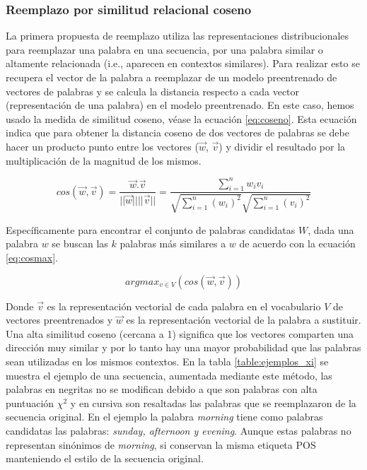 

\subsubsection{Reemplazo por similitud relacional coseno}

La primera propuesta de reemplazo utiliza las representaciones distribucionales para reemplazar una palabra en una secuencia, por una palabra similar o altamente relacionada (i.e., aparecen en contextos similares). Para realizar esto se recupera el vector de la palabra a reemplazar de un modelo preentrenado de vectores de palabras y se calcula la distancia respecto a cada vector (representación de una palabra) en el modelo preentrenado. En este caso, hemos usado la medida de similitud coseno, véase la ecuación \ref{eq:coseno}. Esta ecuación indica que para obtener la distancia coseno de dos vectores de palabras se debe hacer un producto punto entre los vectores ($\vec{w}$, $\vec{v}$) y dividir el resultado por la multiplicación de la magnitud de los mismos.

\begin{equation}
\label{eq:coseno}
    cos(\vec{w},\vec{v})=\frac{\vec{w} . \vec{v}}{||\vec{w}||||\vec{v}||} = \frac{\sum_{i=1}^{n}w_i v_i}{\sqrt{\sum_{i=1}^{n}(w_i)^2} \sqrt{\sum_{i=1}^{n}(v_i)^2} }
\end{equation}

Específicamente para encontrar el conjunto de palabras candidatas $W$, dada una palabra $w$ se buscan las $k$ palabras más similares a $w$ de acuerdo con la ecuación \ref{eq:cosmax}.

\begin{equation}
    \label{eq:cosmax}
    argmax_{v \in V} (cos(\vec{w}, \vec{v}))
\end{equation}

Donde $\vec{v}$ es la representación vectorial de cada palabra en el vocabulario $V$ de vectores preentrenados y $\vec{w}$ es la representación vectorial de la palabra a sustituir. Una alta similitud coseno (cercana a 1) significa que los vectores comparten una dirección muy similar y por lo tanto hay una mayor probabilidad que las palabras sean utilizadas en los mismos contextos. En la tabla \ref{table:ejemplos_xi} se muestra el ejemplo de una secuencia, aumentada mediante este método, las palabras en negritas no se modifican debido a que son palabras con alta puntuación $\chi^2$ y en cursiva son resaltadas las palabras que se reemplazaron de la secuencia original. En el ejemplo la palabra \textit{morning} tiene como palabras candidatas las palabras:\textit{ sunday, afternoon y evening}. Aunque estas palabras no representan sinónimos de \textit{morning}, si conservan la misma etiqueta POS manteniendo el estilo de la secuencia original. 

